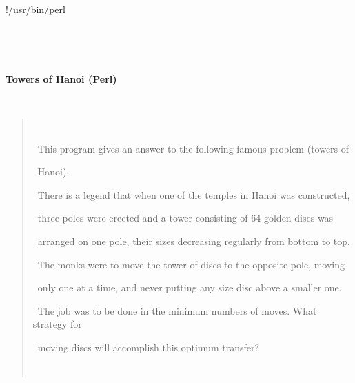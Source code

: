 \documentclass[a4paper,10pt]{article}
\def\mc{\relax}
\begin{document}
\tt\mc 

\noindent
\mbox{}\rm\mc {\tt\#}!/usr/bin/perl
\tt\mc 

\noindent
\mbox{}\rm\mc {\tt\#} \hrulefill 
\tt\mc 

\noindent
\mbox{}\rm\mc {\tt\#}
\tt\mc 

\noindent
\mbox{}\rm\mc {\tt\#} \ %
\tt\mc 

\noindent
\mbox{}\rm\mc {\tt\#}
\tt\mc 

\noindent
\mbox{}\rm\mc {\tt\#} \ \centerline{\bf Towers of Hanoi (Perl)} 
\tt\mc 

\noindent
\mbox{}\rm\mc {\tt\#}
\tt\mc 

\noindent
\mbox{}\rm\mc {\tt\#} \ \begin{quote} 
\tt\mc 

\noindent
\mbox{}\rm\mc {\tt\#} \ \noindent 
\tt\mc 

\noindent
\mbox{}\rm\mc {\tt\#} \ This program gives an answer to the following famous problem (towers of 
\tt\mc 

\noindent
\mbox{}\rm\mc {\tt\#} \ Hanoi). 
\tt\mc 

\noindent
\mbox{}\rm\mc {\tt\#} \ There is a legend that when one of the temples in Hanoi was constructed, 
\tt\mc 

\noindent
\mbox{}\rm\mc {\tt\#} \ three poles were erected and a tower consisting of 64 golden discs was 
\tt\mc 

\noindent
\mbox{}\rm\mc {\tt\#} \ arranged on one pole, their sizes decreasing regularly from bottom to top. 
\tt\mc 

\noindent
\mbox{}\rm\mc {\tt\#} \ The monks were to move the tower of discs to the opposite pole, moving 
\tt\mc 

\noindent
\mbox{}\rm\mc {\tt\#} \ only one at a time, and never putting any size disc above a smaller one. 
\tt\mc 

\noindent
\mbox{}\rm\mc {\tt\#} \ The job was to be done in the minimum numbers of moves. What strategy for 
\tt\mc 

\noindent
\mbox{}\rm\mc {\tt\#} \ moving discs will accomplish this optimum transfer? 
\tt\mc 

\noindent
\mbox{}\rm\mc {\tt\#} \ \end{quote} 
\tt\mc 

\noindent
\mbox{}\rm\mc {\tt\#}
\tt\mc 

\noindent
\mbox{}\rm\mc {\tt\#} \ %
\tt\mc 

\noindent
\mbox{}\rm\mc {\tt\#}
\tt\mc 
\end{document}
